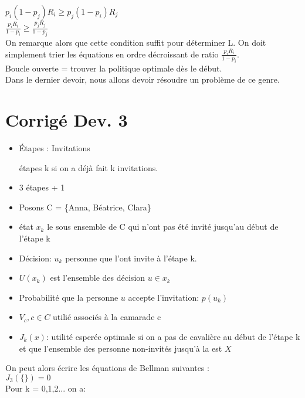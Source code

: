 \documentclass[oneside]{book}
\begin{document}
$p_i(1-p_j)R_i \geq p_j(1-p_i)R_j$ \\

\textbf{$\frac{p_iR_i}{1-p_i} \geq \frac{p_jR_j}{1-p_j}$ }\\

On remarque alors que cette condition suffit pour déterminer L. On doit simplement trier les équations en ordre décroissant de ratio $\frac{p_iR_i}{1-p_i}$. \\


Boucle ouverte = trouver la politique optimale dès le début. \\


Dans le dernier devoir, nous allons devoir résoudre un problème de ce genre. 

\section{Corrigé Dev. 3}
\begin{itemize}
\item Étapes : Invitations\\
\begin{itemize}
étapes k si on a déjà fait k invitations. \\
\end{itemize}	
\item 3 étapes + 1
\item Posons C = \{Anna, Béatrice, Clara\}

\item état $x_k$ le sous ensemble de C qui n'ont pas été invité jusqu'au début de l'étape k
\item Décision: $u_k$ personne que l'ont invite à l'étape k.

\item $U(x_k)$ est  l'ensemble des décision $u \in x_k$
\item Probabilité que la personne $u$ accepte l'invitation: $p(u_k)$
\item $V_c, c \in C$ utilié associés à la camarade c
\item $J_k(x)$: utilité esperée optimale si on a pas de cavalière au début de l'étape k et que l'ensemble des personne non-invités jusqu'à la est $X$

\end{itemize}
On peut alors écrire les équations de Bellman suivantes :\\

\centering
$J_3(\{\}) = 0$\\
Pour k = 0,1,2... on a:\\
\end{document}
